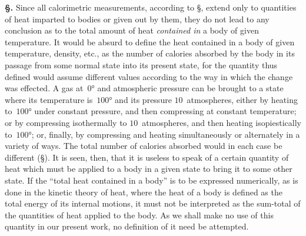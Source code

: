 \documentclass[12pt]{book}[2005/09/16]
\newcommand{\Section}[1]{
  \medskip\par\textbf{§\;#1}
  \label{section:#1}
}
\newcommand{\SecRef}[2][§\;]{\hyperref[section:#2.]{{\upshape #1#2}}}
\newcommand{\PageSep}[1]{\ignorespaces}
\begin{document}
\Section{51.} Since all calorimetric measurements, according to
\SecRef{44}, extend only to quantities of heat imparted to bodies or
given out by them, they do not lead to any conclusion as
to the total amount of heat \emph{contained in} a body of given
temperature. It would be absurd to define the heat contained
in a body of given temperature, density, etc., as the
number of calories absorbed by the body in its passage from
some normal state into its present state, for the quantity
thus defined would assume different values according to the
way in which the change was effected. A gas at~$0°$ and
atmospheric pressure can be brought to a state where its
temperature is~$100°$ and its pressure $10$~atmospheres, either
by heating to~$100°$ under constant pressure, and then compressing
at constant temperature; or by compressing
isothermally to $10$~atmospheres, and then heating isopiestically
to~$100°$; or, finally, by compressing and heating
simultaneously or alternately in a variety of ways. The
total number of calories absorbed would in each case be
different (\SecRef{77}). It is seen, then, that it is useless to speak
of a certain quantity of heat which must be applied to a
body in a given state to bring it to some other state. If
the ``total heat contained in a body'' is to be expressed
numerically, as is done in the kinetic theory of heat, where
the heat of a body is defined as the total energy of its
internal motions, it must not be interpreted as the sum-total
of the quantities of heat applied to the body. As we
\PageSep{36}
shall make no use of this quantity in our present work, no
definition of it need be attempted.
\end{document}
